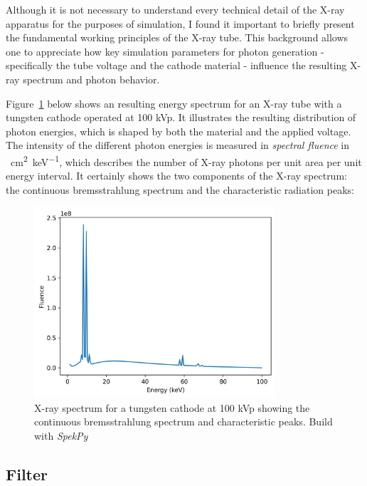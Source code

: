 Although it is not necessary to understand every technical detail of the X-ray
apparatus for the purposes of simulation, I found it important to briefly
present the fundamental working principles of the X-ray tube. This background
allows one to appreciate how key simulation parameters for photon generation -
specifically the tube voltage and the cathode material - influence the resulting
X-ray spectrum and photon behavior.

Figure~\ref{fig:spectrum100kvp} below shows an resulting energy spectrum for an
X-ray tube with a tungsten cathode operated at 100 kVp. It illustrates the
resulting distribution of photon energies, which is shaped by both the material
and the applied voltage. The intensity of the different photon energies is
measured in \emph{spectral fluence} in
\si{\per\square\centi\meter\per\kilo\electronvolt}, which describes the number
of X-ray photons per unit area per unit energy interval. It certainly shows the
two components of the X-ray spectrum: the continuous bremsstrahlung spectrum and
the characteristic radiation peaks:

\begin{figure}[H]
    \centering
    \includegraphics[width=0.8\textwidth]{Figures/spectrum_without_filter.png}
    \caption{X-ray spectrum for a tungsten cathode at 100 kVp showing the
    continuous bremsstrahlung spectrum and characteristic peaks. Build with
    \emph{SpekPy} \cite{spekpy}}
    \label{fig:spectrum100kvp}
\end{figure}


\subsection{Filter}
\label{sec:filter}

